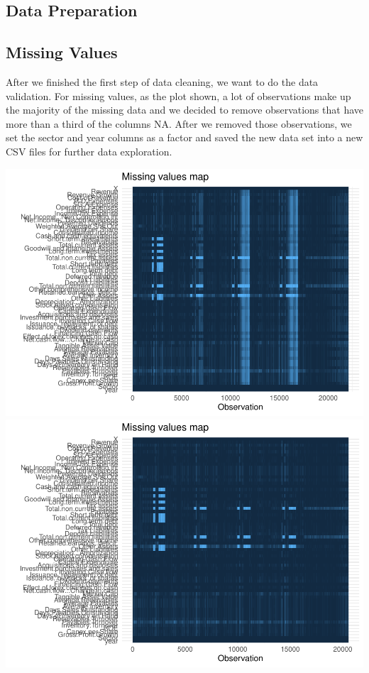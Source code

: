 \documentclass[11pt,]{article}
\begin{document}
\hypertarget{data-preparation}{%
\subsection{Data Preparation}\label{data-preparation}}

\hypertarget{missing-values}{%
\subsection{Missing Values}\label{missing-values}}

After we finished the first step of data cleaning, we want to do the
data validation. For missing values, as the plot shown, a lot of
observations make up the majority of the missing data and we decided to
remove observations that have more than a third of the columns NA. After
we removed those observations, we set the sector and year columns as a
factor and saved the new data set into a new CSV files for further data
exploration.

\includegraphics{stock_analysis_files/figure-latex/missing values-1.pdf}
\includegraphics{stock_analysis_files/figure-latex/missing values-2.pdf}
\end{document}
